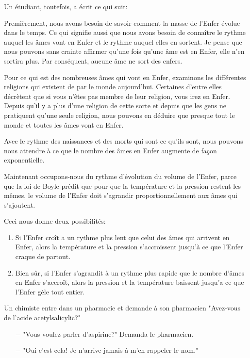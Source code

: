 Un étudiant, toutefois, a écrit ce qui suit: 

Premièrement, nous avons besoin de savoir comment la masse de l'Enfer évolue dans le temps. Ce qui signifie aussi que nous avons besoin de connaître le rythme auquel les âmes vont en Enfer et le rythme auquel elles en sortent. Je pense que nous pouvons sans crainte affirmer qu'une fois qu'une âme est en Enfer, elle n'en sortira plus. Par conséquent, aucune âme ne sort des enfers.

Pour ce qui est des nombreuses âmes qui vont en Enfer, examinons les différentes religions qui existent de par le monde aujourd'hui. Certaines d'entre elles décrètent que si vous n'êtes pas membre de leur religion, vous irez en Enfer. Depuis qu'il y a plus d'une religion de cette sorte et depuis que les gens ne pratiquent qu'une seule religion, nous pouvons en déduire que presque tout le monde et toutes les âmes vont en Enfer.

Avec le rythme des naissances et des morts qui sont ce qu'ils sont, nous pouvons nous attendre à ce que le nombre des âmes en Enfer augmente de façon exponentielle.

Maintenant occupons-nous du rythme d'évolution du volume de l'Enfer, parce que la loi de Boyle prédit que pour que la température et la pression restent les mêmes, le volume de l'Enfer doit s'agrandir proportionnellement aux âmes qui s'ajoutent.

Ceci nous donne deux possibilités:

\begin{enumerate}
	\item Si l'Enfer croît a un rythme plus lent que celui des âmes qui arrivent en Enfer, alors la température et la pression s'accroissent jusqu'à ce que l'Enfer craque de partout.

	\item Bien sûr, si l'Enfer s'agrandit à un rythme plus rapide que le nombre d'âmes en Enfer s'accroît, alors la pression et la température baissent jusqu'a ce que l'Enfer gèle tout entier.
\end{enumerate}

\begin{center}\underline{\hspace{5 cm}}\end{center}

Un chimiste entre dans un pharmacie et demande à son pharmacien "Avez-vous de l'acide acetylsalicylic?"


\begin{itemize}
	\item[$-$] "Vous voulez parler d'aspirine?" Demanda le pharmacien.

	\item[$-$] "Oui c'est cela! Je n'arrive jamais à m'en rappeler le nom."
\end{itemize}


